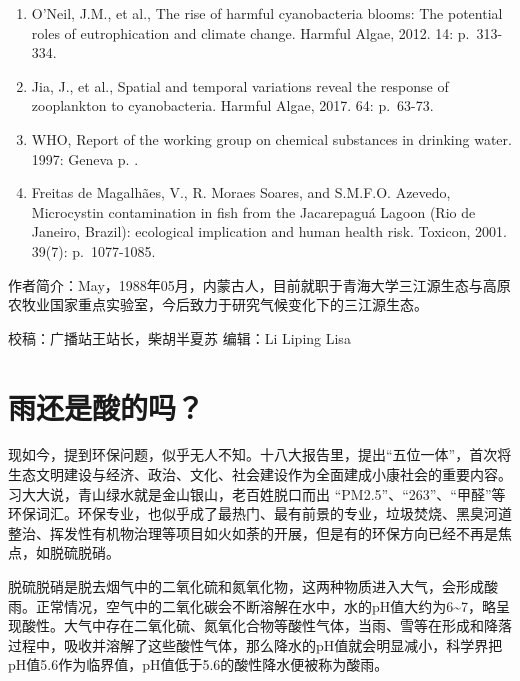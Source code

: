 \documentclass[]{book}
\begin{document}
\begin{enumerate}
\item
  O'Neil, J.M., et al., The rise of harmful cyanobacteria blooms: The potential roles of eutrophication and climate change. Harmful Algae, 2012. 14: p.~313-334.
\item
  Jia, J., et al., Spatial and temporal variations reveal the response of zooplankton to cyanobacteria. Harmful Algae, 2017. 64: p.~63-73.
\item
  WHO, Report of the working group on chemical substances in drinking water. 1997: Geneva p. .
\item
  Freitas de Magalhães, V., R. Moraes Soares, and S.M.F.O. Azevedo, Microcystin contamination in fish from the Jacarepaguá Lagoon (Rio de Janeiro, Brazil): ecological implication and human health risk. Toxicon, 2001. 39(7): p.~1077-1085.
\end{enumerate}

作者简介：May，1988年05月，内蒙古人，目前就职于青海大学三江源生态与高原农牧业国家重点实验室，今后致力于研究气候变化下的三江源生态。

校稿：广播站王站长，柴胡半夏苏
编辑：Li Liping Lisa

\hypertarget{ux96e8ux8fd8ux662fux9178ux7684ux5417}{%
\section{雨还是酸的吗？}\label{ux96e8ux8fd8ux662fux9178ux7684ux5417}}

现如今，提到环保问题，似乎无人不知。十八大报告里，提出``五位一体''，首次将生态文明建设与经济、政治、文化、社会建设作为全面建成小康社会的重要内容。习大大说，青山绿水就是金山银山，老百姓脱口而出 ``PM2.5''、``263''、``甲醛''等环保词汇。环保专业，也似乎成了最热门、最有前景的专业，垃圾焚烧、黑臭河道整治、挥发性有机物治理等项目如火如荼的开展，但是有的环保方向已经不再是焦点，如脱硫脱硝。

脱硫脱硝是脱去烟气中的二氧化硫和氮氧化物，这两种物质进入大气，会形成酸雨。正常情况，空气中的二氧化碳会不断溶解在水中，水的pH值大约为6\textasciitilde{}7，略呈现酸性。大气中存在二氧化硫、氮氧化合物等酸性气体，当雨、雪等在形成和降落过程中，吸收并溶解了这些酸性气体，那么降水的pH值就会明显减小，科学界把pH值5.6作为临界值，pH值低于5.6的酸性降水便被称为酸雨。
\end{document}
